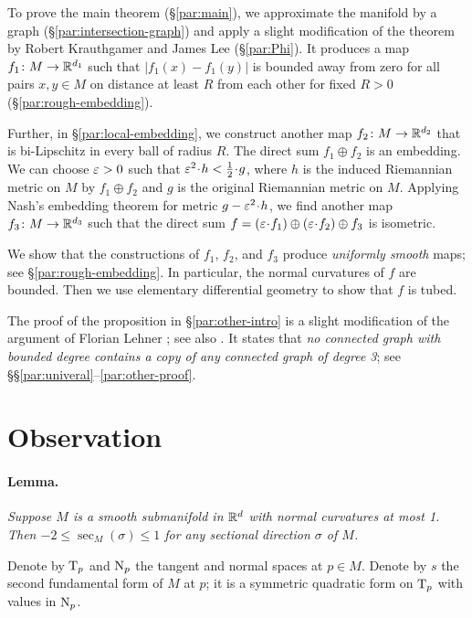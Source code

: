 \documentclass[a4paper,10pt]{article}
\begin{document}
To prove the main theorem (§\ref{par:main}), we approximate the manifold by a graph (§\ref{par:intersection-graph}) and apply a slight modification of 
the theorem by Robert Krauthgamer and James Lee \cite{krauthgamer-lee0,krauthgamer-lee1} (§\ref{par:Phi}).
It produces a map $f_1\colon M\to \mathbb{R}^{d_1}$ such that $|f_1(x)-f_1(y)|$ is bounded away from zero for all pairs $x,y\in M$ on distance at least $R$ from each other for fixed $R>0$ (§\ref{par:rough-embedding}).

Further, in §\ref{par:local-embedding}, we construct another map $f_2\colon M\to \mathbb{R}^{d_2}$ that is bi-Lipschitz in every ball of radius $R$.
The direct sum $f_1\oplus f_2$ is an embedding.
We can choose $\varepsilon>0$ such that $\eps^2\cdot h<\tfrac12\cdot g$,
where $h$ is the induced Riemannian metric on $M$ by $f_1\oplus f_2$ and $g$ is the original Riemannian metric on $M$.
Applying Nash's embedding theorem for metric $g-\eps^2\cdot h$,
we find another map $f_3\colon M\to \mathbb{R}^{d_3}$ such that the direct sum $f=(\eps\cdot f_1)\oplus (\eps\cdot  f_2)\oplus f_3$ is isometric.

We show that the constructions of $f_1$, $f_2$, and $f_3$ produce \textit{uniformly smooth} maps; see  §\ref{par:rough-embedding}.
In particular, the normal curvatures of $f$ are bounded.
Then we use elementary differential geometry to show that $f$ is tubed. 

The proof of the proposition in §\ref{par:other-intro} is a slight modification of the argument of Florian Lehner \cite[1.2]{lehner}; see also \cite{462670}. 
It states that \textit{no connected graph with bounded degree contains a copy of any connected graph of degree 3}; see §§\ref{par:univeral}--\ref{par:other-proof}.

\section*{Observation}

\paragraph{Lemma.}\label{lem:gauss}
\textit{Suppose $M$ is a smooth submanifold in $\mathbb{R}^d$ with normal curvatures at most 1.
Then $-2\le \sec_M(\sigma)\le 1$ for any sectional direction $\sigma$ of $M$.}
\medskip

Denote by $\mathrm{T}_p$ and $\mathrm{N}_p$ the tangent and normal spaces at $p\in M$.
Denote by $s$ the second fundamental form of $M$ at $p$;
it is a symmetric quadratic form on $\mathrm{T}_p$ with values in $\mathrm{N}_p$.
\end{document}
